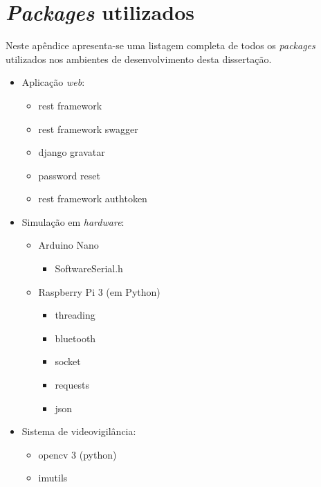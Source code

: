 \chapter{\textit{Packages} utilizados}
\label{packagesAnex}


Neste apêndice apresenta-se uma listagem completa de todos os \textit{packages} utilizados nos ambientes de desenvolvimento desta dissertação. 


\begin{itemize}
	\item Aplicação \textit{web}: 
	
			\begin{itemize}

				\item rest framework
				\item rest framework swagger
				\item django gravatar
				\item password reset
				\item rest framework authtoken

			\end{itemize}
			
	
	
	\item Simulação em \textit{hardware}: 
	\begin{itemize}
		\item Arduino Nano 
		
		\begin{itemize}
			\item SoftwareSerial.h
		\end{itemize}
		
		
		\item Raspberry Pi 3 (em Python)
		
		\begin{itemize}
			\item threading
			\item bluetooth
			\item socket
			\item requests
			\item json
		\end{itemize}
		
	\end{itemize}
	
	
	\item Sistema de videovigilância: 
	
	\begin{itemize}
			\item opencv 3 (python)
			\item imutils 
			
	\end{itemize}


	
\end{itemize}